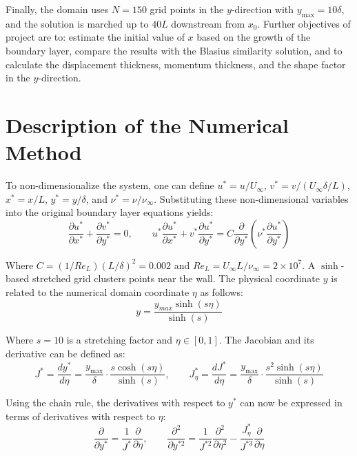 \documentclass[letterpaper,12pt]{article}
\begin{document}
Finally, the domain uses $N = 150$ grid points in the $y$-direction with $y_{\max} = 10\delta$, and the solution is marched up to $40L$ downstream from $x_0$. Further objectives of project are to: estimate the initial value of $x$ based on the growth of the boundary layer, compare the results with the Blasius similarity solution, and to calculate the displacement thickness, momentum thickness, and the shape factor in the $y$-direction.

\section{Description of the Numerical Method}

To non-dimensionalize the system, one can define $u^* = u/U_\infty$, $v^* = v/(U_\infty \delta/L)$, $x^* = x/L$, $y^* = y/\delta$, and $\nu^* = \nu/\nu_\infty$. Substituting these non-dimensional variables into the original boundary layer equations yields:
\begin{equation}
    \frac{\partial u^*}{\partial x^*} + \frac{\partial v^*}{\partial y^*} = 0, \qquad
    u^* \frac{\partial u^*}{\partial x^*} + v^* \frac{\partial u^*}{\partial y^*} = C \frac{\partial}{\partial y^*}\!\left(\nu^* \frac{\partial u^*}{\partial y^*}\right) \label{eq:nd_eqs}
\end{equation}

Where $C = (1/Re_L)(L/\delta)^2 = 0.002$ and $Re_L = U_\infty L/\nu_\infty = 2 \times 10^7$. A $\sinh$-based stretched grid clusters points near the wall. The physical coordinate $y$ is related to the numerical domain coordinate $\eta$ as follows:
\begin{equation}
    y = \frac{y_{max} \sinh(s \eta)}{\sinh(s)}
\end{equation}

Where $s = 10$ is a stretching factor and $\eta \in [0,1]$. The Jacobian and its derivative can be defined as:
\begin{equation}
    J^* = \frac{dy^*}{d\eta} = \frac{y_{\max}}{\delta} \cdot \frac{s \cosh(s\eta)}{\sinh(s)}, \qquad
    J^*_\eta = \frac{dJ^*}{d\eta} = \frac{y_{\max}}{\delta} \cdot \frac{s^2 \sinh(s\eta)}{\sinh(s)}
\end{equation}

Using the chain rule, the derivatives with respect to $y^*$ can now be expressed in terms of derivatives with respect to $\eta$:
\begin{equation}
    \frac{\partial}{\partial y^*} = \frac{1}{J^*} \frac{\partial}{\partial \eta}, \qquad
    \frac{\partial^2}{\partial y^{*2}} = \frac{1}{J^{*2}} \frac{\partial^2}{\partial \eta^2} - \frac{J^*_\eta}{J^{*3}} \frac{\partial}{\partial \eta} \label{eq:chain_rule}
\end{equation}
\end{document}
